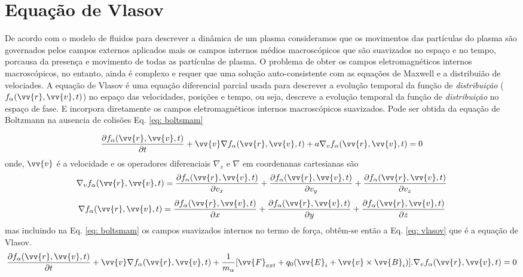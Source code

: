\documentclass[12pt,oneside,a4paper]{abntex2}
\theoremstyle{definition}  %
\begin{document}
\section{Equação de Vlasov}
De acordo com o modelo de fluidos para descrever a dinâmica de um plasma consideramos que os movimentos das partículas do plasma são governados pelos campos externos aplicados mais os campos internos médios macroscópicos que são suavizados no espaço e no tempo, porcausa da presença e movimento de todas as partículas de plasma. O problema de obter os campos eletromagnéticos internos macroscópicos, no entanto, ainda é complexo e requer que uma solução auto-consistente com as equações de Maxwell e a distribuião de velociades.
A equação de Vlasov é uma equação diferencial parcial usada para descrever a evolução temporal da função de \textit{distribuição} ($f_\alpha(\vv{r},\vv{v},t)$) no espaço das velocidades, posições e tempo, ou seja, descreve a evolução temporal da função de \textit{distribuição} no espaço de fase. E incorpora diretamente os campos eletromagnéticos internos macroscópicos suavizados. Pode ser obtida da equação de Boltzmann na ausencia de colisões Eq. \ref{eq: boltsmam} \cite[p. 193]{bittencourt}

\begin{equation}
\label{eq: boltsmam}
\frac{\partial f_\alpha(\vv{r},\vv{v},t)}{\partial t} +\vv{v} \nabla f_\alpha(\vv{r},\vv{v},t) + a \nabla_v f_\alpha(\vv{r},\vv{v},t) = 0
\end{equation}  
onde, $\vv{v}$ é a velocidade e os operadores diferenciais $\nabla_v$ e $\nabla$ em coordenanas cartesianas são 
$$\nabla_v f_\alpha(\vv{r},\vv{v},t) =  \frac{\partial f_\alpha(\vv{r},\vv{v},t)}{\partial v_x} + \frac{\partial f_\alpha(\vv{r},\vv{v},t)}{\partial v_y} + \frac{\partial f_\alpha(\vv{r},\vv{v},t)}{\partial v_z}$$  
$$\nabla f_\alpha(\vv{r},\vv{v},t) = \frac{\partial f_\alpha(\vv{r},\vv{v},t)}{\partial x} + \frac{\partial f_\alpha(\vv{r},\vv{v},t)}{\partial y} + \frac{\partial f_\alpha(\vv{r},\vv{v},t)}{\partial z}$$
mas incluindo na Eq. \ref{eq: boltsmam} os campos suavizados internos no termo de força, obtêm-se então a Eq. \ref{eq: vlasov} que é a equação de Vlasov.
\begin{equation}
\label{eq: vlasov}
\frac{\partial f_\alpha(\vv{r},\vv{v},t)}{\partial t} +\vv{v} \nabla f_\alpha(\vv{r},\vv{v},t) + \frac{1}{m_\alpha}[\vv{F}_{ext}+q_0(\vv{E}_i+\vv{v} \times \vv{B}_i)] . \nabla_v f_\alpha(\vv{r},\vv{v},t)= 0
\end{equation}
\end{document}
